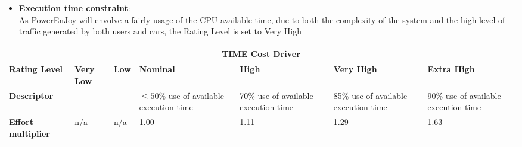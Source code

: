 \begin{itemize}
\item \textbf{Execution time constraint}:\\
As PowerEnJoy will envolve a fairly usage of the CPU available time, due to both the complexity of the system and the high level of traffic generated by both users and cars, the Rating Level is set to Very High
\end{itemize}
\hspace*{-3cm}\begin{tabular}{|p{3cm}|p{2cm}|p{2cm}|p{2cm}|p{2cm}|p{2cm}|p{2cm}|}
\hline
\multicolumn{7}{|c|}{\textbf{TIME Cost Driver}}\\
\hline
\hline
\textbf{Rating Level} & \textbf{Very Low} & \textbf{Low} & \textbf{Nominal} & \textbf{High} & \textbf{Very High} & \textbf{Extra High}\\
\hline
\textbf{Descriptor} &  &  & $\leq 50\%$ use of available execution time & 70\% use of available execution time & 85\% use of available execution time & 90\% use of available execution time\\
\hline
\textbf{Effort multiplier} & n/a & n/a & 1.00 & 1.11 & 1.29 & 1.63\\
\hline 
\end{tabular}
